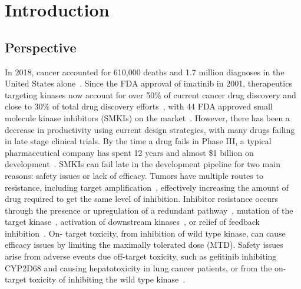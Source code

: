 \documentclass[phd,tocprelim]{cornell}
\DeclareRobustCommand{\gobblefive}[5]{}
\newcommand*{\SkipTocEntry}{\addtocontents{toc}{\gobblefive}}
\begin{document}
\SkipTocEntry\contentspage
\tablelistpage
\figurelistpage


\normalspacing \setcounter{page}{1} 
\pagestyle{cornell} \addtolength{\parskip}{0.5\baselineskip}

\chapter{Introduction}

\section{Perspective}
In 2018, cancer accounted for 610,000 deaths and 1.7 million diagnoses in the United States alone~\citep{Siegel:2018cq}. Since the FDA approval of imatinib in 2001, therapeutics targeting kinases now account for over 50\% of current cancer drug discovery and close to 30\% of total drug discovery efforts~\citep{Cohen:2010fs}, with 44 FDA approved small molecule kinase inhibitors (SMKIs) on the market~\citep{fda-approved-kinase-inhibitors}. However, there has been a decrease in productivity using current design strategies, with many drugs failing in late stage clinical trials. By the time a drug fails in Phase III, a typical pharmaceutical company has spent 12 years and almost \$1 billion on development~\citep{Paul:2010ff}. SMKIs can fail late in the development pipeline for two main reasons: safety issues or lack of efficacy. Tumors have multiple routes to resistance, including target amplification~\citep{SanchezVega:2018jg,Bose:2013gl}, effectively increasing the amount of drug required to get the same level of inhibition. Inhibitor resistance occurs through the presence or upregulation of a redundant pathway~\citep{Prahallad:2012iw,Engelman:2007ka}, mutation of the target kinase~\citep{Pao:2005dp,Drilon:2017gb}, activation of downstream kinases~\citep{Knight:Nat.Rev.Cancer:2010}, or relief of feedback inhibition~\citep{Chandarlapaty:CancerCell:2011}. On- target toxicity, from inhibition of wild type kinase, can cause efficacy issues by limiting the maximally tolerated dose (MTD). Safety issues arise from adverse events due off-target toxicity, such as gefitinib inhibiting CYP2D68 and causing hepatotoxicity in lung cancer patients, or from the on-target toxicity of inhibiting the wild type kinase~\citep{Rudmann2013-hi,Liu2014-yi}. 
\end{document}

